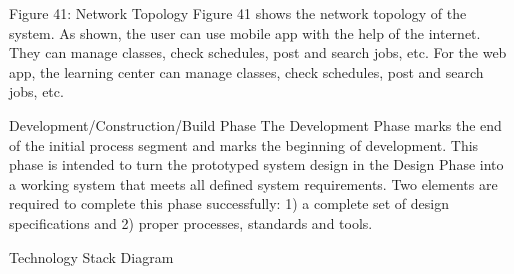 Figure 41: Network Topology
	Figure 41 shows the network topology of the system. As shown, the user can use mobile app with the help of the internet. They can manage classes, check schedules, post and search jobs, etc. For the web app, the learning center can manage classes, check schedules, post and search jobs, etc.

Development/Construction/Build Phase
The Development Phase marks the end of the initial process segment and marks the beginning of development. This phase is intended to turn the prototyped system design in the Design Phase into a working system that meets all defined system requirements. Two elements are required to complete this phase successfully: 1) a complete set of design specifications and 2) proper processes, standards and tools.

Technology Stack Diagram
 
